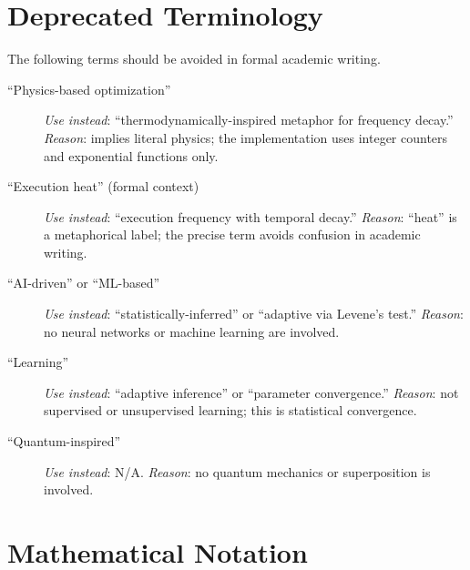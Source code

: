\section*{Deprecated Terminology}

The following terms should be avoided in formal academic writing.

\begin{description}

\item[``Physics-based optimization'']
\textit{Use instead}: ``thermodynamically-inspired metaphor for frequency
decay.''
\textit{Reason}: implies literal physics; the implementation uses integer
counters and exponential functions only.

\item[``Execution heat'' (formal context)]
\textit{Use instead}: ``execution frequency with temporal decay.''
\textit{Reason}: ``heat'' is a metaphorical label; the precise term avoids
confusion in academic writing.

\item[``AI-driven'' or ``ML-based'']
\textit{Use instead}: ``statistically-inferred'' or ``adaptive via Levene's
test.''
\textit{Reason}: no neural networks or machine learning are involved.

\item[``Learning'']
\textit{Use instead}: ``adaptive inference'' or ``parameter convergence.''
\textit{Reason}: not supervised or unsupervised learning; this is statistical
convergence.

\item[``Quantum-inspired'']
\textit{Use instead}: N/A.
\textit{Reason}: no quantum mechanics or superposition is involved.

\end{description}

\section*{Mathematical Notation}

